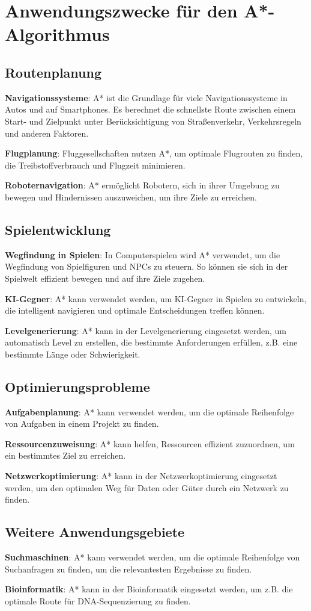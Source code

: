 \chapter{Anwendungszwecke für den A*-Algorithmus}

\section{Routenplanung}
\textbf{ Navigationssysteme}: A* ist die Grundlage für viele Navigationssysteme in Autos und auf Smartphones. Es berechnet die schnellste Route zwischen einem Start- und Zielpunkt unter Berücksichtigung von Straßenverkehr, Verkehrsregeln und anderen Faktoren.

\textbf{ Flugplanung}: Fluggesellschaften nutzen A*, um optimale Flugrouten zu finden, die Treibstoffverbrauch und Flugzeit minimieren.

\textbf{ Roboternavigation}: A* ermöglicht Robotern, sich in ihrer Umgebung zu bewegen und Hindernissen auszuweichen, um ihre Ziele zu erreichen.

\section{Spielentwicklung}
\textbf{ Wegfindung in Spielen}: In Computerspielen wird A* verwendet, um die Wegfindung von Spielfiguren und NPCs zu steuern. So können sie sich in der Spielwelt effizient bewegen und auf ihre Ziele zugehen.

\textbf{ KI-Gegner}: A* kann verwendet werden, um KI-Gegner in Spielen zu entwickeln, die intelligent navigieren und optimale Entscheidungen treffen können.

\textbf{  Levelgenerierung}: A* kann in der Levelgenerierung eingesetzt werden, um automatisch Level zu erstellen, die bestimmte Anforderungen erfüllen, z.B. eine bestimmte Länge oder Schwierigkeit.

\section{Optimierungsprobleme}
\textbf{ Aufgabenplanung}: A* kann verwendet werden, um die optimale Reihenfolge von Aufgaben in einem Projekt zu finden.

\textbf{ Ressourcenzuweisung}: A* kann helfen, Ressourcen effizient zuzuordnen, um ein bestimmtes Ziel zu erreichen.

\textbf{ Netzwerkoptimierung}: A* kann in der Netzwerkoptimierung eingesetzt werden, um den optimalen Weg für Daten oder Güter durch ein Netzwerk zu finden.

\section{Weitere Anwendungsgebiete}

\textbf{ Suchmaschinen}: A* kann verwendet werden, um die optimale Reihenfolge von Suchanfragen zu finden, um die relevantesten Ergebnisse zu finden.

\textbf{ Bioinformatik}: A* kann in der Bioinformatik eingesetzt werden, um z.B. die optimale Route für DNA-Sequenzierung zu finden.
